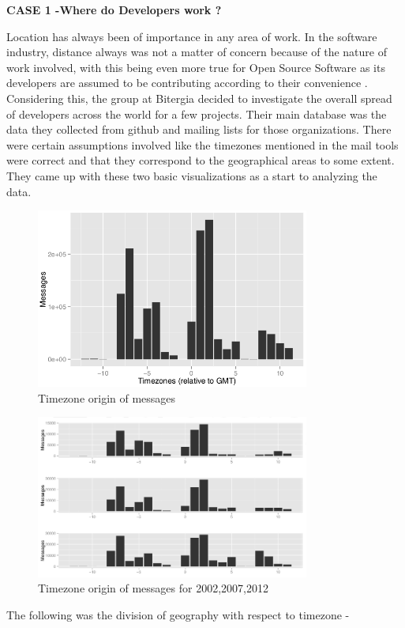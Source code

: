 \documentclass[double,12pt]{beavtex}
\begin{document}
 \textbf{CASE 1 -Where do Developers work ?}

Location has always been of importance in any area of work. In the software industry, distance always was not a matter of concern because of the nature of work involved, with this being even more true for Open Source Software as its developers are assumed to be contributing according to their convenience \cite{yuri2010}. Considering this, the group at Bitergia decided to investigate the overall spread of developers across the world for a few projects. Their main database was the data they collected from github and mailing lists for those organizations. There were certain assumptions involved like the timezones mentioned in the mail tools were correct and that they correspond to the geographical areas to some extent. They came up with these two basic visualizations as a start to analyzing the data.

\begin{figure}[!ht]
\centering
\includegraphics[width=90mm]{work1.png}
\caption{Timezone origin of messages}
\end{figure}

\begin{figure}[!ht]
\centering
\includegraphics[width=90mm]{work2.png}
\caption{Timezone origin of messages for 2002,2007,2012}
\end{figure}

The following was the division of geography with respect to timezone -
\end{document}
